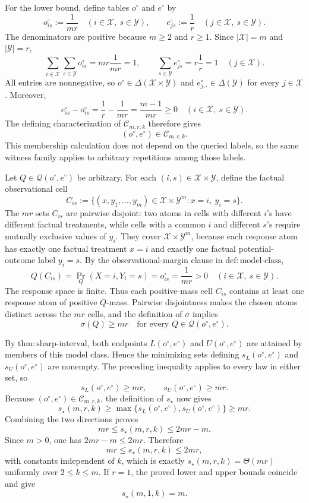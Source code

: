 For the lower bound, define tables \(o^\circ\) and \(e^\circ\) by
\[
o^\circ_{is}:=\frac1{mr}
\quad(i\in\mathcal X,\ s\in\mathcal Y),
\qquad
e^\circ_{js}:=\frac1r
\quad(j\in\mathcal X,\ s\in\mathcal Y).
\]
The denominators are positive because \(m\geq2\) and \(r\geq1\).  Since \(|\mathcal X|=m\) and \(|\mathcal Y|=r\),
\[
\sum_{i\in\mathcal X}\sum_{s\in\mathcal Y}o^\circ_{is}
=mr\frac1{mr}=1,
\qquad
\sum_{s\in\mathcal Y}e^\circ_{js}
=r\frac1r=1
\quad(j\in\mathcal X).
\]
All entries are nonnegative, so \(o^\circ\in\Delta(\mathcal X\times\mathcal Y)\) and \(e^\circ_{j,\cdot}\in\Delta(\mathcal Y)\) for every \(j\in\mathcal X\).  Moreover,
\[
e^\circ_{is}-o^\circ_{is}
=\frac1r-\frac1{mr}
=\frac{m-1}{mr}\geq0
\quad(i\in\mathcal X,\ s\in\mathcal Y).
\]
The defining characterization of \(\mathcal C_{m,r,k}\) therefore gives
\[
(o^\circ,e^\circ)\in\mathcal C_{m,r,k}.
\]
This membership calculation does not depend on the queried labels, so the same witness family applies to arbitrary repetitions among those labels.

Let \(Q\in\mathcal Q(o^\circ,e^\circ)\) be arbitrary.  For each \((i,s)\in\mathcal X\times\mathcal Y\), define the factual observational cell
\[
C_{is}:=\{(x,y_1,\ldots,y_m)\in\mathcal X\times\mathcal Y^m:x=i,\ y_i=s\}.
\]
The \(mr\) sets \(C_{is}\) are pairwise disjoint: two atoms in cells with different \(i\)'s have different factual treatments, while cells with a common \(i\) and different \(s\)'s require mutually exclusive values of \(y_i\).  They cover \(\mathcal X\times\mathcal Y^m\), because each response atom has exactly one factual treatment \(x=i\) and exactly one factual potential-outcome label \(y_i=s\).  By the observational-margin clause in \(\mathrm{def{:}model\mbox{-}class}\),
\[
Q(C_{is})
=\Pr_Q(X=i,Y_i=s)
=o^\circ_{is}
=\frac1{mr}>0
\quad(i\in\mathcal X,\ s\in\mathcal Y).
\]
The response space is finite.  Thus each positive-mass cell \(C_{is}\) contains at least one response atom of positive \(Q\)-mass.  Pairwise disjointness makes the chosen atoms distinct across the \(mr\) cells, and the definition of \(\sigma\) implies
\[
\sigma(Q)\geq mr
\quad\text{for every }Q\in\mathcal Q(o^\circ,e^\circ).
\]

By \(\mathrm{thm{:}sharp\mbox{-}interval}\), both endpoints \(L(o^\circ,e^\circ)\) and \(U(o^\circ,e^\circ)\) are attained by members of this model class.  Hence the minimizing sets defining \(s_L(o^\circ,e^\circ)\) and \(s_U(o^\circ,e^\circ)\) are nonempty.  The preceding inequality applies to every law in either set, so
\[
s_L(o^\circ,e^\circ)\geq mr,
\qquad
s_U(o^\circ,e^\circ)\geq mr.
\]
Because \((o^\circ,e^\circ)\in\mathcal C_{m,r,k}\), the definition of \(s_\star\) now gives
\[
s_\star(m,r,k)
\geq\max\{s_L(o^\circ,e^\circ),s_U(o^\circ,e^\circ)\}
\geq mr.
\]
Combining the two directions proves
\[
mr\leq s_\star(m,r,k)\leq2mr-m.
\]
Since \(m>0\), one has \(2mr-m\leq2mr\).  Therefore
\[
mr\leq s_\star(m,r,k)\leq2mr,
\]
with constants independent of \(k\), which is exactly \(s_\star(m,r,k)=\Theta(mr)\) uniformly over \(2\leq k\leq m\).  If \(r=1\), the proved lower and upper bounds coincide and give
\[
s_\star(m,1,k)=m.
\]

